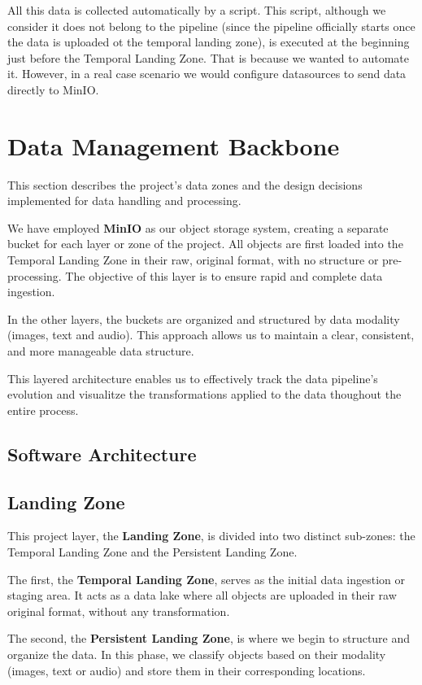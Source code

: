 \documentclass[12pt]{article}
\begin{document}
All this data is collected automatically by a script. This script, although we consider it does not belong to the pipeline (since the pipeline officially starts once the data is uploaded ot the temporal landing zone), is executed at the beginning just before the Temporal Landing Zone. That is because we wanted to automate it. However, in a real case scenario we would configure datasources to send data directly to MinIO. 

\section{Data Management Backbone}

This section describes the project's data zones and the design decisions implemented for data handling and processing.

We have employed \textbf{MinIO} as our object storage system, creating a separate bucket for each layer or zone of the project. All objects are first loaded into the Temporal Landing Zone in their raw, original format, with no structure or pre-processing. The objective of this layer is to ensure rapid and complete data ingestion.

In the other layers, the buckets are organized and structured by data modality (images, text and audio). This approach allows us to maintain a clear, consistent, and more manageable data structure.

This layered architecture enables us to effectively track the data pipeline's evolution and visualitze the transformations applied to the data thoughout the entire process.

\subsection{Software Architecture}

\subsection{Landing Zone}

This project layer, the \textbf{Landing Zone}, is divided into two distinct sub-zones: the Temporal Landing Zone and the Persistent Landing Zone.

The first, the \textbf{Temporal Landing Zone}, serves as the initial data ingestion or staging area. It acts as a data lake where all objects are uploaded in their raw original format, without any transformation.

The second, the \textbf{Persistent Landing Zone}, is where we begin to structure and organize the data. In this phase, we classify objects based on their modality (images, text or audio) and store them in their corresponding locations.
\end{document}
